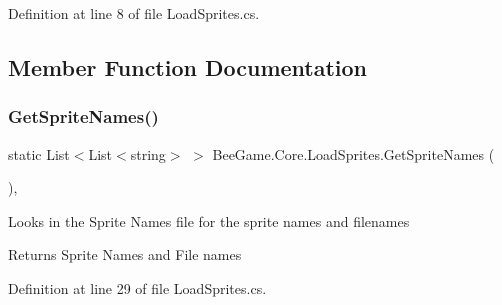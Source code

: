 Definition at line 8 of file Load\+Sprites.\+cs.



\subsection{Member Function Documentation}
\mbox{\label{class_bee_game_1_1_core_1_1_load_sprites_a3dca64c0b272b40389047ae9722bfcd3}} 
\subsubsection{\texorpdfstring{Get\+Sprite\+Names()}{GetSpriteNames()}}
{\footnotesize\ttfamily static List$<$List$<$string$>$ $>$ Bee\+Game.\+Core.\+Load\+Sprites.\+Get\+Sprite\+Names (\begin{DoxyParamCaption}{ }\end{DoxyParamCaption})\hspace{0.3cm}{\ttfamily [static]}, {\ttfamily [private]}}



Looks in the Sprite Names file for the sprite names and filenames 

\begin{DoxyReturn}{Returns}
Sprite Names and File names
\end{DoxyReturn}


Definition at line 29 of file Load\+Sprites.\+cs.


